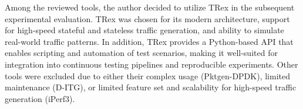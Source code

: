 Among the reviewed tools, the author decided to utilize TRex in the subsequent experimental evaluation.  
TRex was chosen for its modern architecture, support for high-speed stateful and stateless traffic generation, and ability to simulate real-world traffic patterns.  
In addition, TRex provides a Python-based API that enables scripting and automation of test scenarios, making it well-suited for integration into continuous testing pipelines and reproducible experiments.  
Other tools were excluded due to either their complex usage (Pktgen-DPDK), limited maintenance (D-ITG), or limited feature set and scalability for high-speed traffic generation (iPerf3).

